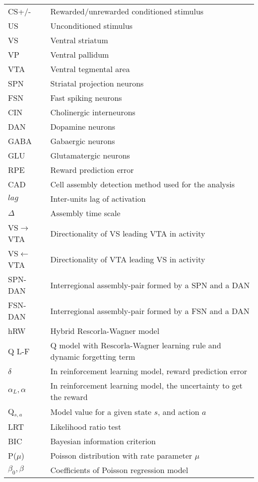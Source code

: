 \begin{tabular}{l l}
CS+/- &{Rewarded/unrewarded conditioned stimulus}\\
US &{Unconditioned stimulus}\\
VS &{Ventral striatum}\\
VP &{Ventral pallidum}\\
VTA &{Ventral tegmental area}\\
SPN &{Striatal projection neurons}\\
FSN &{Fast spiking neurons}\\
CIN &{Cholinergic interneurons}\\
DAN &{Dopamine neurons}\\
GABA &{Gabaergic neurons}\\
GLU &{Glutamatergic neurons}\\
RPE &{Reward prediction error}\\
CAD &{Cell assembly detection method used for the analysis}\\
$lag$ &{Inter-units lag of activation}\\
$\Delta$ &{Assembly time scale}\\
VS$\rightarrow$VTA &{Directionality of VS leading VTA in activity}\\
VS$\leftarrow$VTA &{Directionality of VTA leading VS in activity}\\
SPN-DAN &{Interregional assembly-pair formed by a SPN and a DAN}\\
FSN-DAN &{Interregional assembly-pair formed by a FSN and a DAN}\\
hRW &{Hybrid Rescorla-Wagner model}\\
Q L-F &{Q model with Rescorla-Wagner learning rule and dynamic forgetting term}\\
$\delta$ &{In reinforcement learning model, reward prediction error}\\
$\alpha_L,\alpha$ &{In reinforcement learning model, the uncertainty to get the reward}\\
Q$_{s,a}$ &{Model value for a given state $s$, and action $a$}\\
LRT &{Likelihood ratio test}\\
BIC &{Bayesian information criterion}\\
P($\mu$) &{Poisson distribution with rate parameter $\mu$}\\
$\beta_0,\beta$ &{Coefficients of Poisson regression model}\\
\end{tabular}